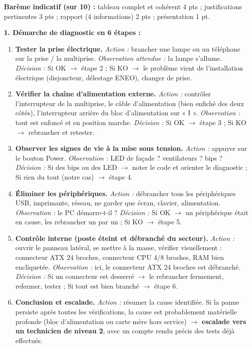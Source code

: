 \documentclass[11pt]{article}
\begin{document}
\begin{corrige}
\textbf{Barème indicatif (sur 10) :} tableau complet et cohérent 4 pts ; justifications pertinentes 3 pts ; rapport (4 informations) 2 pts ; présentation 1 pt.
\end{corrige}

\begin{corrige}
\textbf{1. Démarche de diagnostic en 6 étapes :}

\begin{enumerate}
    \item \textbf{Tester la prise électrique.} \emph{Action :} brancher une lampe ou un téléphone sur la prise / la multiprise. \emph{Observation attendue :} la lampe s'allume. \emph{Décision :} Si OK $\to$ étape 2 ; Si KO $\to$ le problème vient de l'installation électrique (disjoncteur, délestage ENEO), changer de prise.
    \item \textbf{Vérifier la chaîne d'alimentation externe.} \emph{Action :} contrôler l'interrupteur de la multiprise, le câble d'alimentation (bien enfiché des deux côtés), l'interrupteur arrière du bloc d'alimentation sur « I ». \emph{Observation :} tout est enfoncé et en position marche. \emph{Décision :} Si OK $\to$ étape 3 ; Si KO $\to$ rebrancher et retester.
    \item \textbf{Observer les signes de vie à la mise sous tension.} \emph{Action :} appuyer sur le bouton Power. \emph{Observation :} LED de façade ? ventilateurs ? bips ? \emph{Décision :} Si des bips ou des LED $\to$ noter le code et orienter le diagnostic ; Si rien du tout (notre cas) $\to$ étape 4.
    \item \textbf{Éliminer les périphériques.} \emph{Action :} débrancher tous les périphériques USB, imprimante, réseau, ne garder que écran, clavier, alimentation. \emph{Observation :} le PC démarre-t-il ? \emph{Décision :} Si OK $\to$ un périphérique était en cause, les rebrancher un par un ; Si KO $\to$ étape 5.
    \item \textbf{Contrôle interne (poste éteint et débranché du secteur).} \emph{Action :} ouvrir le panneau latéral, se mettre à la masse, vérifier visuellement : connecteur ATX 24 broches, connecteur CPU 4/8 broches, RAM bien encliquetée. \emph{Observation :} ici, le connecteur ATX 24 broches est débranché. \emph{Décision :} Si un connecteur est desserré $\to$ le rebrancher fermement, refermer, tester ; Si tout est bien branché $\to$ étape 6.
    \item \textbf{Conclusion et escalade.} \emph{Action :} résumer la cause identifiée. Si la panne persiste après toutes les vérifications, la cause est probablement matérielle profonde (bloc d'alimentation ou carte mère hors service) $\to$ \textbf{escalade vers un technicien de niveau 2}, avec un compte rendu précis des tests déjà effectués.
\end{enumerate}


\end{corrige}
\end{document}
